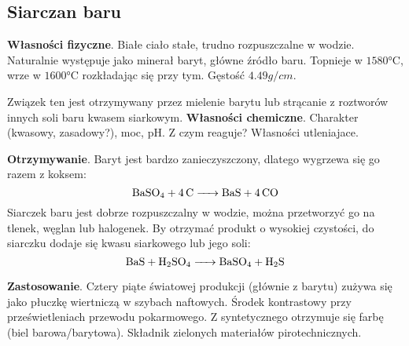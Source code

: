 \subsection{Siarczan baru }
\textbf{Własności fizyczne}.
Białe ciało stałe, trudno rozpuszczalne w wodzie.
Naturalnie występuje jako minerał baryt, główne źródło baru.
Topnieje w $1580 \si{\celsius}$, wrze w $1600 \si{\celsius}$ rozkładając się przy tym.
Gęstość $4.49 \si{g \per cm}$.

Związek ten jest otrzymywany przez mielenie barytu lub strącanie z roztworów innych soli baru kwasem siarkowym.
\textbf{Własności chemiczne}.
Charakter (kwasowy, zasadowy?), moc, pH.
Z czym reaguje?
Własności utleniajace.

\textbf{Otrzymywanie}.
Baryt jest bardzo zanieczyszczony, dlatego wygrzewa się go razem z koksem:
$$\ce{BaSO4 + 4C -> BaS + 4CO}$$
Siarczek baru jest dobrze rozpuszczalny w wodzie, można przetworzyć go na tlenek, węglan lub halogenek.
By otrzymać produkt o wysokiej czystości, do siarczku dodaje się kwasu siarkowego lub jego soli:
$$\ce{BaS + H2SO4 -> BaSO4 + H2S}$$

\textbf{Zastosowanie}.
Cztery piąte światowej produkcji (głównie z barytu) zużywa się jako płuczkę wiertniczą w szybach naftowych.
Środek kontrastowy przy prześwietleniach przewodu pokarmowego.
Z syntetycznego otrzymuje się farbę (biel barowa/barytowa).
Składnik zielonych materiałów pirotechnicznych.
